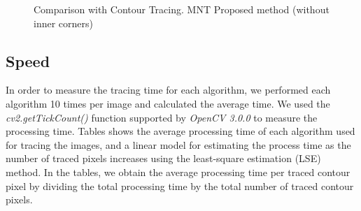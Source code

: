 \begin{figure}[htbp]
	\centering

	\caption{Comparison with Contour Tracing. \protect{} MNT \protect{} Proposed method (without inner corners)}
	\label{fig:image17}
\end{figure}


\subsection{Speed}


In order to measure the tracing time for each algorithm, we performed each algorithm 10 times per image and calculated the average time. We used the \textit{cv2.getTickCount()} function supported by \textit{OpenCV 3.0.0} to measure the processing time. Tables  shows the average processing time of each algorithm used for tracing the images, and a linear model for estimating the process time as the number of traced pixels increases using the least-square estimation (LSE) method. In the tables, we obtain the average processing time per traced contour pixel by dividing the total processing time by the total number of traced contour pixels.

